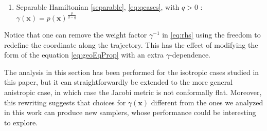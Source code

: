 \documentclass[twoside,11pt]{article}
\begin{document}
\begin{proposition}
\begin{enumerate}
      \item Separable Hamiltonian \eqref{separable}, \eqref{eq:qcases}, with $q > 0$ : \ $\gamma(\mathbf{x}) = p (\mathbf{x})^{\frac{q}{d - q}}$
  \end{enumerate}
\end{proposition}

Notice that one can remove the weight factor $\gamma^{- 1}$ in \eqref{eq:rhs} using the freedom to redefine the coordinate along the trajectory. This has the effect of modifying the form of the equation \eqref{eq:geoEqProp} with an extra $\gamma$-dependence.  

The analysis in this section has been performed for the isotropic cases studied in this paper, but it can straightforwardly be
extended to the more general anistropic case, in which case the Jacobi metric is not conformally flat.
Moreover, this rewriting suggests that choices for $\gamma(\mathbf{x})$ different from the ones we analyzed in this work can produce new samplers, whose performance could be interesting to explore.


\vskip 0.2in


\end{document}
